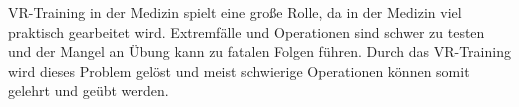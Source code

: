 VR-Training in der Medizin spielt eine große Rolle, da in der Medizin viel praktisch gearbeitet wird. Extremfälle und Operationen sind schwer zu testen und der Mangel an Übung kann zu fatalen Folgen führen. Durch das VR-Training wird dieses Problem gelöst und meist schwierige Operationen können somit gelehrt und geübt werden.

